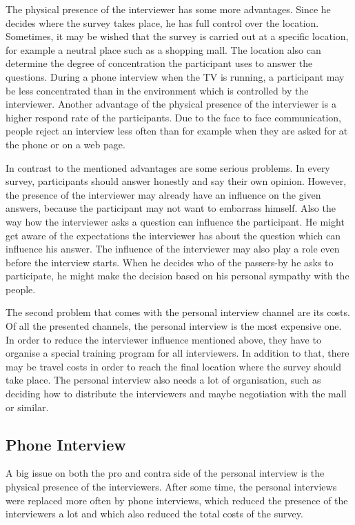 \documentclass{article}
\begin{document}
The physical presence of the interviewer has some more advantages. Since he decides where the survey takes place, he has full control over the location. Sometimes, it may be wished that the survey is carried out at a specific location, for example a neutral place such as a shopping mall. The location also can determine the degree of concentration the participant uses to answer the questions. During a phone interview when the TV is running, a participant may be less concentrated than in the environment which is controlled by the interviewer. Another advantage of the physical presence of the interviewer is a higher respond rate of the participants. Due to the face to face communication, people reject an interview less often than for example when they are asked for at the phone or on a web page.

In contrast to the mentioned advantages are some serious problems. In every survey, participants should answer honestly and say their own opinion. However, the presence of the interviewer may already have an influence on the given answers, because the participant may not want to embarrass himself. Also the way how the interviewer asks a question can influence the participant. He might get aware of the expectations the interviewer has about the question which can influence his answer. The influence of the interviewer may also play a role even before the interview starts. When he decides who of the passers-by he asks to participate, he might make the decision based on his personal sympathy with the people.

The second problem that comes with the personal interview channel are its costs. Of all the presented channels, the personal interview is the most expensive one. In order to reduce the interviewer influence mentioned above, they have to organise a special training program for all interviewers. In addition to that, there may be travel costs in order to reach the final location where the survey should take place. The personal interview also needs a lot of organisation, such as deciding how to distribute the interviewers and maybe negotiation with the mall or similar.

\subsection{Phone Interview}

A big issue on both the pro and contra side of the personal interview is the physical presence of the interviewers. After some time, the personal interviews were replaced more often by phone interviews, which reduced the presence of the interviewers a lot and which also reduced the total costs of the survey.
\end{document}
